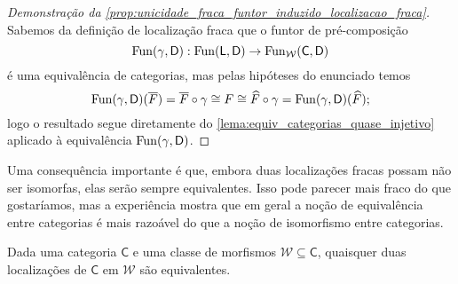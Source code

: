 \begin{proof}[Demonstração da \cref{prop:unicidade_fraca_funtor_induzido_localizacao_fraca}]
  Sabemos da definição de localização fraca que o funtor de pré-composição
  \begin{displaymath}
    \mathrm{Fun}(\gamma,\mathsf{D}): \mathrm{Fun}(\mathsf{L},\mathsf{D}) \to \mathrm{Fun}_{\mathcal{W}}(\mathsf{C},\mathsf{D})
  \end{displaymath}
  é uma equivalência de categorias, mas pelas hipóteses do enunciado temos
  \begin{displaymath}
    \mathrm{Fun}(\gamma,\mathsf{D})(\overline{F}) = \overline{F} \circ \gamma \cong F \cong \widehat{F} \circ \gamma = \mathrm{Fun}(\gamma,\mathsf{D})(\widehat{F});
  \end{displaymath}
  logo o resultado segue diretamente do \cref{lema:equiv_categorias_quase_injetivo} aplicado à equivalência $\mathrm{Fun}(\gamma,\mathsf{D})$.
\end{proof}

Uma consequência importante é que, embora duas localizações fracas possam não ser isomorfas, elas serão sempre equivalentes.
Isso pode parecer mais fraco do que gostaríamos, mas a experiência mostra que em geral a noção de equivalência entre categorias é mais razoável do que a noção de isomorfismo entre categorias.

\begin{corol}\label{corol:localizacao_fraca_unica_a_menos_de_equiv}
  Dada uma categoria $\mathsf{C}$ e uma classe de morfismos $\mathcal{W} \subseteq \mathsf{C}$, quaisquer duas localizações de $\mathsf{C}$ em $\mathcal{W}$ são equivalentes.
\end{corol}

